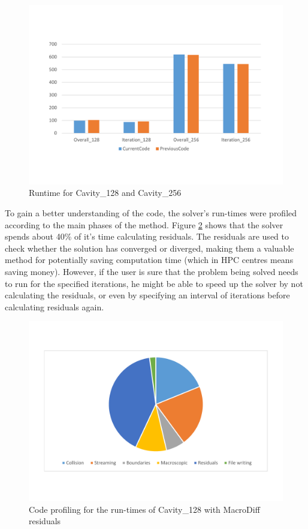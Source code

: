 \documentclass[12pt, openany]{book}
\begin{document}
\begin{figure}[H]
	\centering
	\includegraphics[width=0.9\linewidth]{Resources/Images/compareTimes.pdf}
	\caption{Runtime for Cavity\_128 and Cavity\_256}
	\label{fig:compareTimes}
\end{figure}


To gain a better understanding of the code, the solver’s run-times were profiled according to the main phases of the method. Figure \ref{fig:initialProfiling} shows that the solver spends about 40\% of it’s time calculating residuals. The residuals are used to check whether the solution has converged or diverged, making them a valuable method for potentially saving computation time (which in HPC centres means saving money). However, if the user is sure that the problem being solved needs to run for the specified iterations, he might be able to speed up the solver by not calculating the residuals, or even by specifying an interval of iterations before calculating residuals again.

\begin{figure}[H]
	\centering
	\includegraphics[width=0.9\linewidth]{Resources/Images/initialProfiling.pdf}
	\caption{Code profiling for the run-times of Cavity\_128 with MacroDiff residuals}
	\label{fig:initialProfiling}
\end{figure}
\end{document}
